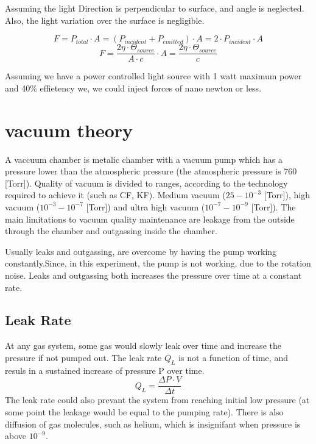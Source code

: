 \documentclass[\main/master.tex]{subfiles}
\begin{document}
Assuming the light Direction is perpendicular to surface, and angle is neglected. Also, the light variation over the surface is negligible.

\begin{equation}
F = P_{total}\cdot A = (P_{incident}+P_{emitted})\cdot A = 2\cdot P_{incident}\cdot A\label{eqn:energy-mass-equivalence-relation}
\end{equation}
\begin{equation}
F = \frac{2\eta\cdot\Theta_{source}}{{A\cdot c}}\cdot A = \frac{2\eta\cdot\Theta_{source}}{{c}} \label{eqn:energy-mass-equivalence-relation}
\end{equation}

Assuming we have a power controlled light source with 1 watt maximum power and 40\% effietency we, we could inject forces of nano newton or less.  

 

\section{vacuum theory}
A vaccuum chamber is metalic chamber with a vacuum pump which has a pressure lower than the atmospheric pressure (the atmospheric pressure is 760 [Torr]). Quality of vacuum is divided to ranges, according to the technology required to achieve it (such as CF, KF). Medium vacuum ($25-10^{-3}$ [Torr]), high vacuum ($10^{-3}-10^{-7}$ [Torr]) and ultra high vacuum ($10^{-7}-10^{-9}$ [Torr]). The main limitations to vacuum quality maintenance are leakage from the outside through the chamber and outgassing inside the chamber.
\par
Usually leaks and outgassing, are overcome by having the pump working constantly.Since, in this experiment, the pump is not working, due to the rotation noise. Leaks and outgassing both increases the pressure over time at a constant rate.  

\subsection{Leak Rate}
At any gas system, some gas would slowly leak over time and increase the pressure if not pumped out. The leak rate $Q_L$ is not a function of time, and resuls in a sustained increase of pressure P over time.
\begin{equation}
Q_L = \frac{\Delta P\cdot V}{\Delta t}  \label{eqn:energy-mass-equivalence-relation}
\end{equation}
The leak rate could also prevant the system from reaching initial low pressure (at some point the leakage would be equal to the pumping rate).
There is also diffusion of gas molecules, such as helium, which is insignifant when pressure is above $10^{-9}$. 
\end{document}
